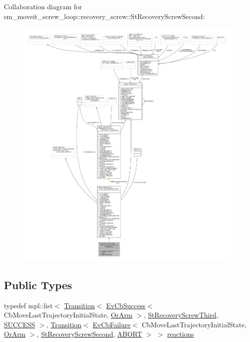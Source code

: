 Collaboration diagram for sm\+\_\+moveit\+\_\+screw\+\_\+loop\+:\+:recovery\+\_\+screw\+:\+:St\+Recovery\+Screw\+Second\+:
\nopagebreak
\begin{figure}[H]
\begin{center}
\leavevmode
\includegraphics[width=350pt]{structsm__moveit__screw__loop_1_1recovery__screw_1_1StRecoveryScrewSecond__coll__graph}
\end{center}
\end{figure}
\subsection*{Public Types}
\begin{DoxyCompactItemize}
\item 
typedef mpl\+::list$<$ \hyperlink{classsmacc_1_1Transition}{Transition}$<$ \hyperlink{structsmacc_1_1EvCbSuccess}{Ev\+Cb\+Success}$<$ Cb\+Move\+Last\+Trajectory\+Initial\+State, \hyperlink{classsm__moveit__screw__loop_1_1OrArm}{Or\+Arm} $>$, \hyperlink{structsm__moveit__screw__loop_1_1recovery__screw_1_1StRecoveryScrewThird}{St\+Recovery\+Screw\+Third}, \hyperlink{structsmacc_1_1default__transition__tags_1_1SUCCESS}{S\+U\+C\+C\+E\+SS} $>$, \hyperlink{classsmacc_1_1Transition}{Transition}$<$ \hyperlink{structsmacc_1_1EvCbFailure}{Ev\+Cb\+Failure}$<$ Cb\+Move\+Last\+Trajectory\+Initial\+State, \hyperlink{classsm__moveit__screw__loop_1_1OrArm}{Or\+Arm} $>$, \hyperlink{structsm__moveit__screw__loop_1_1recovery__screw_1_1StRecoveryScrewSecond}{St\+Recovery\+Screw\+Second}, \hyperlink{structsmacc_1_1default__transition__tags_1_1ABORT}{A\+B\+O\+RT} $>$ $>$ \hyperlink{structsm__moveit__screw__loop_1_1recovery__screw_1_1StRecoveryScrewSecond_a72df84fab4a1f85baa6bd8eeebaece14}{reactions}
\end{DoxyCompactItemize}
